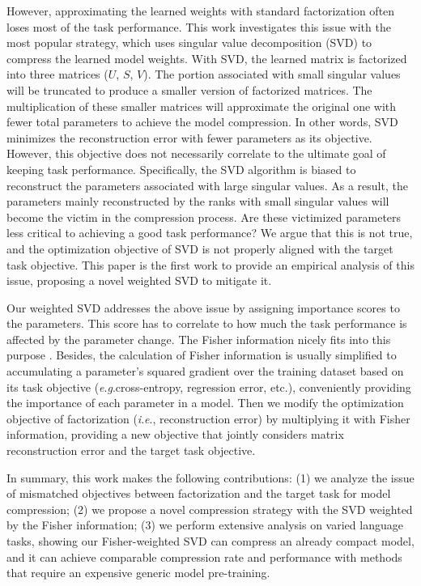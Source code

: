 \documentclass{article} %
\newcommand{\ie}{\textit{i}.\textit{e}.}
\newcommand{\eg}{\textit{e}.\textit{g}.}
\begin{document}
However, approximating the learned weights with standard factorization often loses most of the task performance. This work investigates this issue with the most popular strategy, which uses singular value decomposition (SVD) to compress the learned model weights. With SVD, the learned matrix is factorized into three matrices ($U$, $S$, $V$). The portion associated with small singular values will be truncated to produce a smaller version of factorized matrices. The multiplication of these smaller matrices will approximate the original one with fewer total parameters to achieve the model compression. In other words, SVD minimizes the reconstruction error with fewer parameters as its objective. However, this objective does not necessarily correlate to the ultimate goal of keeping task performance. Specifically, the SVD algorithm is biased to reconstruct the parameters associated with large singular values. As a result, the parameters mainly reconstructed by the ranks with small singular values will become the victim in the compression process. Are these victimized parameters less critical to achieving a good task performance? We argue that this is not true, and the optimization objective of SVD is not properly aligned with the target task objective. 
This paper is the first work to provide an empirical analysis of this issue, proposing a novel weighted SVD to mitigate it. 

Our weighted SVD addresses the above issue by assigning importance scores to the parameters. This score has to correlate to how much the task performance is affected by the parameter change. The Fisher information nicely fits into this purpose \citep{Pascanu14revisitingnatural}. Besides, the calculation of Fisher information is usually simplified to accumulating a parameter's squared gradient over the training dataset based on its task objective (\eg cross-entropy, regression error, etc.), conveniently providing the importance of each parameter in a model. Then we modify the optimization objective of factorization (\ie, reconstruction error) by multiplying it with Fisher information, providing a new objective that jointly considers matrix reconstruction error and the target task objective. 

In summary, this work makes the following contributions: (1) we analyze the issue of mismatched objectives between factorization and the target task for model compression; (2) we propose a novel compression strategy with the SVD weighted by the Fisher information; (3) we perform extensive analysis on varied language tasks, showing our Fisher-weighted SVD can compress an already compact model, and it can achieve comparable compression rate and performance with methods that require an expensive generic model pre-training.
\end{document}
